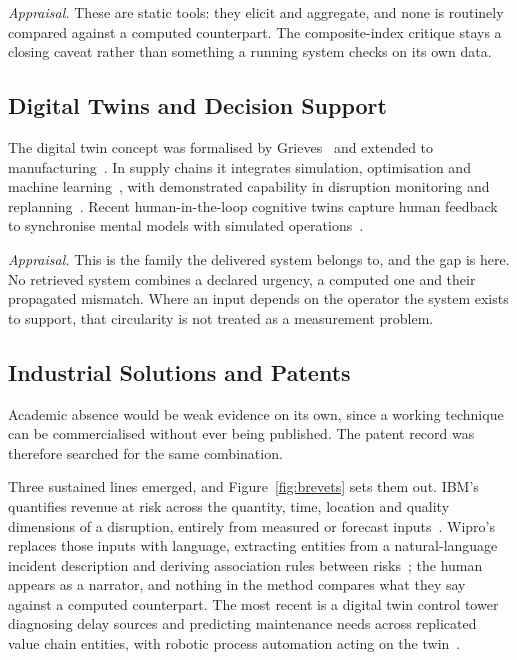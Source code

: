 \emph{Appraisal.} These are static tools: they elicit and aggregate, and none is routinely
compared against a computed counterpart. The composite-index critique stays a closing caveat
rather than something a running system checks on its own data.

\subsection{Digital Twins and Decision Support}

The digital twin concept was formalised by Grieves~\autocite{grieves2014digital} and extended
to manufacturing~\autocite{tao2018digital,fuller2020digital}. In supply chains it integrates
simulation, optimisation and machine learning~\autocite{ivanov2021digital}, with demonstrated
capability in disruption monitoring and
replanning~\autocite{ding2023realtime,leung2022digital,hrusovsky2021realtime}. Recent
human-in-the-loop cognitive twins capture human feedback to synchronise mental models with
simulated operations~\autocite{niloofar2023}.

\emph{Appraisal.} This is the family the delivered system belongs to, and the gap is here. No
retrieved system combines a declared urgency, a computed one and their propagated mismatch.
Where an input depends on the operator the system exists to support, that circularity is not
treated as a measurement problem.

\subsection{Industrial Solutions and Patents}
\label{sec:brevets}

Academic absence would be weak evidence on its own, since a working technique can be
commercialised without ever being published. The patent record was therefore searched for
the same combination.

Three sustained lines emerged, and Figure~\ref{fig:brevets} sets them out. IBM's quantifies
revenue at risk across the quantity, time, location and quality dimensions of a disruption,
entirely from measured or forecast inputs~\autocite{feldman2007measuring}. Wipro's replaces
those inputs with language, extracting entities from a natural-language incident description
and deriving association rules between risks~\autocite{karuppasamy2019predicting}; the human
appears as a narrator, and nothing in the method compares what they say against a computed
counterpart. The most recent is a digital twin control tower diagnosing delay sources and
predicting maintenance needs across replicated value chain entities, with robotic process
automation acting on the twin~\autocite{cella2022digitaltwin}.

